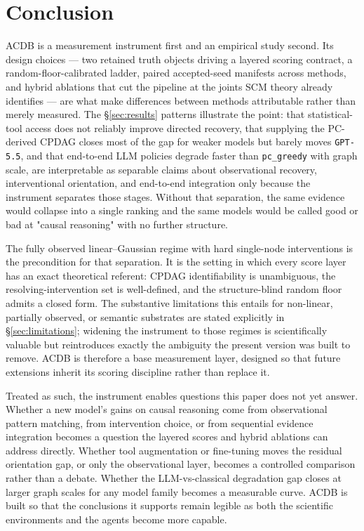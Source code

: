 \section{Conclusion}
\label{sec:conclusion}

ACDB is a measurement instrument first and an empirical study second. Its design choices — two retained truth objects driving a layered scoring contract, a random-floor-calibrated ladder, paired accepted-seed manifests across methods, and hybrid ablations that cut the pipeline at the joints SCM theory already identifies — are what make differences between methods attributable rather than merely measured. The §\ref{sec:results} patterns illustrate the point: that statistical-tool access does not reliably improve directed recovery, that supplying the PC-derived CPDAG closes most of the gap for weaker models but barely moves \texttt{GPT-5.5}, and that end-to-end LLM policies degrade faster than \texttt{pc\_greedy} with graph scale, are interpretable as separable claims about observational recovery, interventional orientation, and end-to-end integration only because the instrument separates those stages. Without that separation, the same evidence would collapse into a single ranking and the same models would be called good or bad at "causal reasoning" with no further structure.

The fully observed linear--Gaussian regime with hard single-node interventions is the precondition for that separation. It is the setting in which every score layer has an exact theoretical referent: CPDAG identifiability is unambiguous, the resolving-intervention set is well-defined, and the structure-blind random floor admits a closed form. The substantive limitations this entails for non-linear, partially observed, or semantic substrates are stated explicitly in §\ref{sec:limitations}; widening the instrument to those regimes is scientifically valuable but reintroduces exactly the ambiguity the present version was built to remove. ACDB is therefore a base measurement layer, designed so that future extensions inherit its scoring discipline rather than replace it.

Treated as such, the instrument enables questions this paper does not yet answer. Whether a new model's gains on causal reasoning come from observational pattern matching, from intervention choice, or from sequential evidence integration becomes a question the layered scores and hybrid ablations can address directly. Whether tool augmentation or fine-tuning moves the residual orientation gap, or only the observational layer, becomes a controlled comparison rather than a debate. Whether the LLM-vs-classical degradation gap closes at larger graph scales for any model family becomes a measurable curve. ACDB is built so that the conclusions it supports remain legible as both the scientific environments and the agents become more capable.
